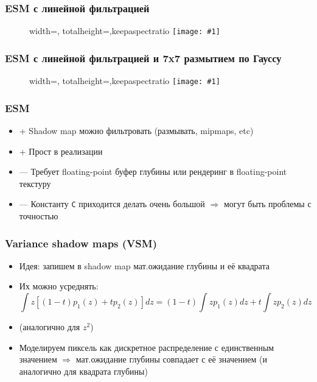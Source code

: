 \documentclass{beamer}
\newcommand{\slideimage}[1]{
  \begin{figure}
    \begin{adjustbox}{width=\textwidth, totalheight=\textheight-2\baselineskip-2\baselineskip,keepaspectratio}
      \texttt{[image: \#1]}
    \end{adjustbox}
  \end{figure}
}
\begin{document}
\begin{frame}[fragile]
\frametitle{ESM с линейной фильтрацией}
\slideimage{exp.png}
\end{frame}

\begin{frame}[fragile]
\frametitle{ESM с линейной фильтрацией и 7x7 размытием по Гауссу}
\slideimage{exp_gauss.png}
\end{frame}

\begin{frame}[fragile]
\frametitle{ESM}
\begin{itemize}
\item {\color{green}+} Shadow map можно фильтровать (размывать, mipmaps, etc)
\item {\color{green}+} Прост в реализации
\item {\color{red}—} Требует floating-point буфер глубины или рендеринг в floating-point текстуру
\item {\color{red}—} Константу \verb|C| приходится делать очень большой \begin{math}\Rightarrow\end{math} могут быть проблемы с точностью
\end{itemize}
\end{frame}

\begin{frame}[fragile]
\frametitle{Variance shadow maps (VSM)}
\begin{itemize}
\item Идея: запишем в shadow map мат.ожидание глубины и её квадрата
\pause
\item Их можно усреднять:
\begin{equation}
\int z \left[(1-t)p_1(z) + tp_2(z)\right] dz = (1-t)\int z p_1(z) dz + t\int z p_2(z) dz
\end{equation}
\item (аналогично для \begin{math}z^2\end{math})
\pause
\item Моделируем пиксель как дискретное распределение с единственным значением \begin{math}\Rightarrow\end{math} мат.ожидание глубины совпадает с её значением (и аналогично для квадрата глубины)
\end{itemize}
\end{frame}
\end{document}

